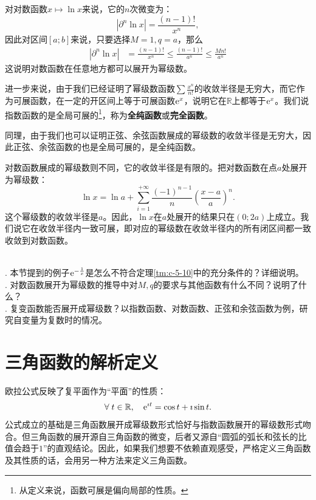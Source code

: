 \documentclass[12pt,UTF8]{ctexbook}
\begin{document}
\begin{appendix}
对对数函数$x\mapsto \ln{x}$来说，它的$n$次微变为：
$$ |\partial^n \ln{x}| = \frac{(n - 1)!}{x^n}, $$
因此对区间$[a;b]$来说，只要选择$M=1,q=a$，那么
\begin{align*}
    |\partial^n \ln{x}| &= \frac{(n - 1)!}{x^n} \leqslant \frac{(n - 1)!}{a^n} \leqslant \frac{M n!}{a^n}
\end{align*}
这说明对数函数在任意地方都可以展开为幂级数。

进一步来说，由于我们已经证明了幂级数函数$\sum \frac{x^n}{n!}$的收敛半径是无穷大，而它作为可展函数，在一定的开区间上等于可展函数$\mathrm{e}^x$，说明它在$\mathbb{R}$上都等于$\mathrm{e}^x$。我们说指数函数的是全局可展的\footnote{从定义来说，函数可展是偏向局部的性质。}，称为\textbf{全纯函数}或\textbf{完全函数}。

同理，由于我们也可以证明正弦、余弦函数展成的幂级数的收敛半径是无穷大，因此正弦、余弦函数的也是全局可展的，是全纯函数。

对数函数展成的幂级数则不同，它的收敛半径是有限的。把对数函数在点$a$处展开为幂级数：
$$ \ln{x} = \ln{a} + \sum_{i=1}^{+\infty} \frac{(-1)^{n-1}}{n} \left(\frac{x - a}{a}\right)^n. $$
这个幂级数的收敛半径是$a$。因此，$\ln{x}$在$a$处展开的结果只在$(0;2a)$上成立。我们说它在收敛半径内一致可展，即对应的幂级数在收敛半径内的所有闭区间都一致收敛到对数函数。

\begin{sk}
    \mbox{} \\
    . 本节提到的例子$\mathrm{e}^{-\frac{1}{x}}$是怎么不符合定理\ref{tm:c-5-10}中的充分条件的？详细说明。\\
    . 对数函数展开为幂级数的推导中对$M,q$的要求与其他函数有什么不同？说明了什么？\\
    . 复变函数能否展开成幂级数？以指数函数、对数函数、正弦和余弦函数为例，研究自变量为复数时的情况。
\end{sk}


\section{三角函数的解析定义}

欧拉公式反映了复平面作为“平面”的性质：
$$ \forall \; t\in\mathbb{R}, \quad \mathrm{e}^{\imath t} = \cos{t} + \imath \sin{t}. $$
公式成立的基础是三角函数展开成幂级数形式恰好与指数函数展开的幂级数形式吻合。但三角函数的展开源自三角函数的微变，后者又源自“圆弧的弧长和弦长的比值会趋于$1$”的直观结论。因此，如果我们想要不依赖直观感受，严格定义三角函数及其性质的话，会用另一种方法来定义三角函数。


\end{appendix}
\end{document}
